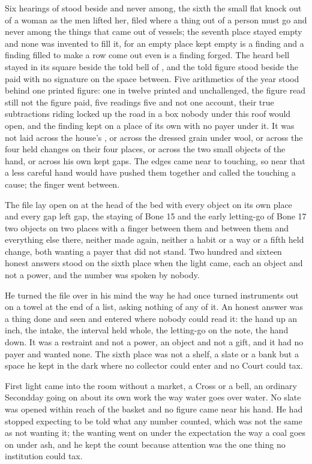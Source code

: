 Six hearings of  stood beside and never among, the sixth the small flat knock out of a woman as the men lifted her, filed where a thing out of a person must go and never among the things that came out of vessels; the seventh place stayed empty and none was invented to fill it, for an empty place kept empty is a finding and a finding filled to make a row come out even is a finding forged. The heard bell stayed in its square beside the told bell of , and the told figure stood beside the paid with no signature on the space between. Five arithmetics of the year stood behind one printed figure: one in twelve printed and unchallenged, the figure read still not the figure paid, five readings five and not one account, their true subtractions riding locked up the road in a box nobody under this roof would open, and the finding kept on a place of its own with no payer under it. It was not laid across the house's , or across the dressed grain under wool, or across the four held changes on their four places, or across the two small objects of the hand, or across his own kept gaps. The edges came near to touching, so near that a less careful hand would have pushed them together and called the touching a cause; the finger went between.

The file lay open on  at the head of the bed with every object on its own place and every gap left gap, the staying of Bone 15 and the early letting-go of Bone 17 two objects on two places with a finger between them and between them and everything else there, neither made again, neither a habit or a way or a fifth held change, both wanting a payer that did not stand. Two hundred and sixteen honest answers stood on the sixth place when the light came, each an object and not a power, and the number was spoken by nobody.

He turned the file over in his mind the way he had once turned instruments out on a towel at the end of a list, asking nothing of any of it. An honest answer was a thing done and seen and entered where nobody could read it: the hand up an inch, the intake, the interval held whole, the letting-go on the note, the hand down. It was a restraint and not a power, an object and not a gift, and it had no payer and wanted none. The sixth place was not a shelf, a slate or a bank but a space he kept in the dark where no collector could enter and no Court could tax.

\scenebreak

First light came into the room without a market, a Cross or a bell, an ordinary Secondday going on about its own work the way water goes over water. No slate was opened within reach of the basket and no figure came near his hand. He had stopped expecting to be told what any number counted, which was not the same as not wanting it; the wanting went on under the expectation the way a coal goes on under ash, and he kept the count because attention was the one thing no institution could tax.

